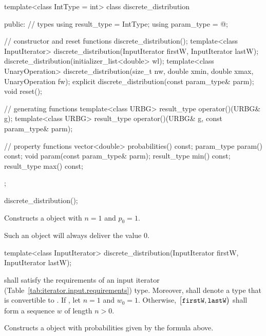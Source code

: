 %
\begin{codeblock}
template<class IntType = int>
 class discrete_distribution
{
public:
 // types
 using result_type = IntType;
 using param_type  = @\unspec@;

 // constructor and reset functions
 discrete_distribution();
 template<class InputIterator>
   discrete_distribution(InputIterator firstW, InputIterator lastW);
 discrete_distribution(initializer_list<double> wl);
 template<class UnaryOperation>
   discrete_distribution(size_t nw, double xmin, double xmax, UnaryOperation fw);
 explicit discrete_distribution(const param_type& parm);
 void reset();

 // generating functions
 template<class URBG>
   result_type operator()(URBG& g);
 template<class URBG>
   result_type operator()(URBG& g, const param_type& parm);

 // property functions
 vector<double> probabilities() const;
 param_type param() const;
 void param(const param_type& parm);
 result_type min() const;
 result_type max() const;
};
\end{codeblock}

\begin{itemdecl}
discrete_distribution();
\end{itemdecl}

\begin{itemdescr}
\pnum\effects Constructs a  object
 with $ n = 1 $
 and $ p_0 = 1 $.
 \begin{note}
   Such an object will always deliver the value $0$.
 \end{note}
\end{itemdescr}


%
\begin{itemdecl}
template<class InputIterator>
  discrete_distribution(InputIterator firstW, InputIterator lastW);
\end{itemdecl}

\begin{itemdescr}
\pnum\requires
   shall satisfy the requirements
  of an input iterator (Table~\ref{tab:iterator.input.requirements}) type.
  Moreover,
  shall denote a type that is convertible to .
 If ,
 let $ n = 1 $
 and $ w_0 = 1 $.
 Otherwise,
 $\bigl[\texttt{firstW}, \texttt{lastW}\bigr)$
 shall form a sequence $w$ of length $n > 0$.

\pnum\effects Constructs a  object
 with probabilities given by the formula above.
\end{itemdescr}



